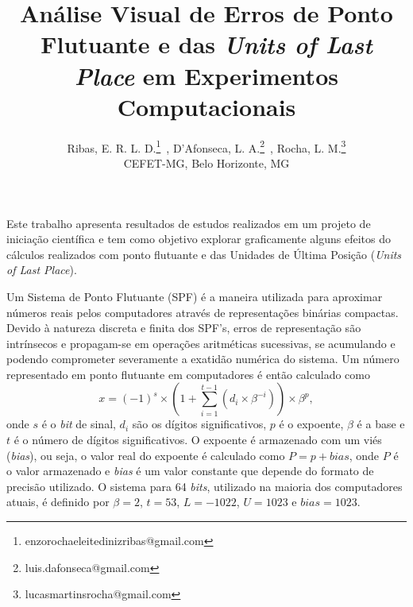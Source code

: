 \documentclass{pssbmac}
\begin{document}

\title{Análise Visual de Erros de Ponto Flutuante e das \textit{Units of Last Place} em Experimentos Computacionais}

\author{
{\large Ribas, E. R. L. D.}\thanks{enzorochaeleitedinizribas@gmail.com}\, ,
{\large D'Afonseca, L. A.}\thanks{luis.dafonseca@gmail.com}\, ,
{\large Rocha, L. M.}\thanks{lucasmartinsrocha@gmail.com}  \\
{\small CEFET-MG, Belo Horizonte, MG} \\
}
\criartitulo

Este trabalho apresenta resultados de estudos realizados em um projeto de
iniciação científica e tem como objetivo explorar graficamente alguns efeitos
do cálculos realizados com ponto flutuante e das Unidades de Última Posição
(\textit{Units of Last Place}).

Um Sistema de Ponto Flutuante (SPF) é a maneira utilizada para aproximar
números reais pelos computadores através de representações binárias compactas.
Devido à natureza discreta e finita dos SPF's, erros de representação são
intrínsecos e propagam-se em operações aritméticas sucessivas, se acumulando e
podendo comprometer severamente a exatidão numérica do sistema. Um número
representado em ponto flutuante em computadores é então calculado como
\begin{equation}
    x =
    \left(-1\right)^s
    \times
    \left(1 + \sum_{i=1}^{t-1}
    \left(d_i \times \beta^{-i}\right)
    \right)
    \times
    \beta^p,
    \label{eq:spf}
\end{equation}
onde $s$ é o \textit{bit} de sinal, $d_i$ são os dígitos significativos, $p$ é o expoente, $\beta$ é a base e $t$ é o número de dígitos significativos. O expoente é armazenado com um viés (\textit{bias}), ou seja, o valor real do expoente é calculado como $P = p + \textit{bias} $, onde $P$ é o valor armazenado e \textit{bias} é um valor constante que depende do formato de precisão utilizado. O sistema para 64 \textit{bits}, utilizado na maioria dos computadores atuais, é definido por $\beta = 2$, $t = 53$, $L = -1022$, $U = 1023$ e $\textit{bias} = 1023$.
\end{document}
